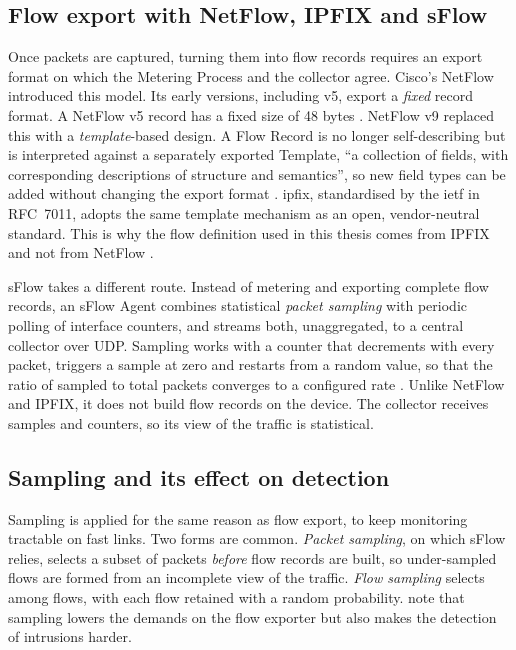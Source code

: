 \subsection{Flow export with NetFlow, IPFIX and sFlow}
\label{sec:flow-export-standards}

Once packets are captured, turning them into flow records requires an export
format on which the Metering Process and the collector agree. Cisco's
NetFlow introduced this model. Its early versions, including v5, export a
\emph{fixed} record format. A NetFlow v5 record has a fixed size of 48 bytes
\citep{sperotto2010flowbased}. NetFlow v9 replaced this with a
\emph{template}-based design. A Flow Record is no longer self-describing but
is interpreted against a separately exported Template, ``a collection of
fields, with corresponding descriptions of structure and semantics'', so new
field types can be added without changing the export format
\citep{claise2004rfc3954}. \gls{ipfix}, standardised by the \gls{ietf} in
RFC~7011, adopts the same template mechanism as an open, vendor-neutral
standard. This is why the flow definition used in this thesis comes from
IPFIX and not from NetFlow \citep{claise2013rfc7011}.

sFlow takes a different route. Instead of metering and exporting complete
flow records, an sFlow Agent combines statistical \emph{packet sampling}
with periodic polling of interface counters, and streams both, unaggregated,
to a central collector over UDP. Sampling works with a counter that
decrements with every packet, triggers a sample at zero and restarts from a
random value, so that the ratio of sampled to total packets converges to a
configured rate \citep{phaal2001rfc3176}. Unlike NetFlow and IPFIX, it does
not build flow records on the device. The collector receives samples and
counters, so its view of the traffic is statistical.

\subsection{Sampling and its effect on detection}
\label{sec:sampling-detection-effect}

Sampling is applied for the same reason as flow export, to keep monitoring
tractable on fast links. Two forms are common. \emph{Packet sampling}, on
which sFlow relies, selects a subset of packets \emph{before} flow records
are built, so under-sampled flows are formed from an incomplete view of the
traffic. \emph{Flow sampling} selects among flows, with each flow retained
with a random probability. \citet{sperotto2010flowbased} note that
sampling lowers the demands on the flow exporter but also makes the
detection of intrusions harder.

